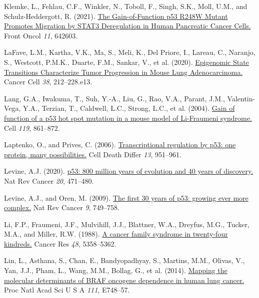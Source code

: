 \begin{CSLReferences}{0}{0}
\leavevmode{}%
Klemke, L., Fehlau, C.F., Winkler, N., Toboll, F., Singh, S.K., Moll, U.M., and Schulz-Heddergott, R. (2021). \href{https://doi.org/10.3389/fonc.2021.642603}{The Gain-of-Function p53 R248W Mutant Promotes Migration by STAT3 Deregulation in Human Pancreatic Cancer Cells.} Front Oncol \emph{11}, 642603.

\leavevmode{}%
LaFave, L.M., Kartha, V.K., Ma, S., Meli, K., Del Priore, I., Lareau, C., Naranjo, S., Westcott, P.M.K., Duarte, F.M., Sankar, V., et al. (2020). \href{https://doi.org/10.1016/j.ccell.2020.06.006}{Epigenomic State Transitions Characterize Tumor Progression in Mouse Lung Adenocarcinoma.} Cancer Cell \emph{38}, 212--228.e13.

\leavevmode{}%
Lang, G.A., Iwakuma, T., Suh, Y.-A., Liu, G., Rao, V.A., Parant, J.M., Valentin-Vega, Y.A., Terzian, T., Caldwell, L.C., Strong, L.C., et al. (2004). \href{https://doi.org/10.1016/j.cell.2004.11.006}{Gain of function of a p53 hot spot mutation in a mouse model of Li-Fraumeni syndrome.} Cell \emph{119}, 861--872.

\leavevmode{}%
Laptenko, O., and Prives, C. (2006). \href{https://doi.org/10.1038/sj.cdd.4401916}{Transcriptional regulation by p53: one protein, many possibilities.} Cell Death Differ \emph{13}, 951--961.

\leavevmode{}%
Levine, A.J. (2020). \href{https://doi.org/10.1038/s41568-020-0262-1}{p53: 800 million years of evolution and 40 years of discovery.} Nat Rev Cancer \emph{20}, 471--480.

\leavevmode{}%
Levine, A.J., and Oren, M. (2009). \href{https://doi.org/10.1038/nrc2723}{The first 30 years of p53: growing ever more complex.} Nat Rev Cancer \emph{9}, 749--758.

\leavevmode{}%
Li, F.P., Fraumeni, J.F., Mulvihill, J.J., Blattner, W.A., Dreyfus, M.G., Tucker, M.A., and Miller, R.W. (1988). \href{https://www.ncbi.nlm.nih.gov/pubmed/3409256}{A cancer family syndrome in twenty-four kindreds.} Cancer Res \emph{48}, 5358--5362.

\leavevmode{}%
Lin, L., Asthana, S., Chan, E., Bandyopadhyay, S., Martins, M.M., Olivas, V., Yan, J.J., Pham, L., Wang, M.M., Bollag, G., et al. (2014). \href{https://doi.org/10.1073/pnas.1320956111}{Mapping the molecular determinants of BRAF oncogene dependence in human lung cancer.} Proc Natl Acad Sci U S A \emph{111}, E748--57.


\end{CSLReferences}
